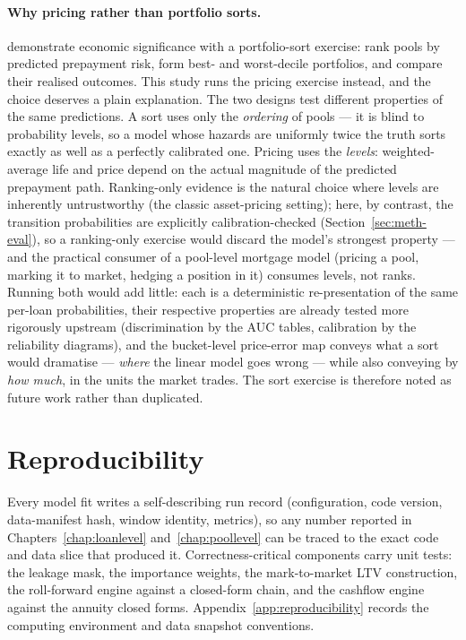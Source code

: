 \paragraph{Why pricing rather than portfolio sorts.}
\citet{sirignano2021} demonstrate economic significance with a
portfolio-sort exercise: rank pools by predicted prepayment risk,
form best- and worst-decile portfolios, and compare their realised
outcomes.  This study runs the pricing exercise instead, and the
choice deserves a plain explanation.  The two designs test different
properties of the same predictions.  A sort uses only the
\emph{ordering} of pools --- it is blind to probability levels, so a
model whose hazards are uniformly twice the truth sorts exactly as
well as a perfectly calibrated one.  Pricing uses the \emph{levels}:
weighted-average life and price depend on the actual magnitude of the
predicted prepayment path.  Ranking-only evidence is the natural
choice where levels are inherently untrustworthy (the classic
asset-pricing setting); here, by contrast, the transition
probabilities are explicitly calibration-checked
(Section~\ref{sec:meth-eval}), so a ranking-only exercise would
discard the model's strongest property --- and the practical consumer
of a pool-level mortgage model (pricing a pool, marking it to market,
hedging a position in it) consumes levels, not ranks.  Running both
would add little: each is a deterministic re-presentation of the same
per-loan probabilities, their respective properties are already
tested more rigorously upstream (discrimination by the AUC tables,
calibration by the reliability diagrams), and the bucket-level
price-error map conveys what a sort would dramatise --- \emph{where}
the linear model goes wrong --- while also conveying by \emph{how
much}, in the units the market trades.  The sort exercise is
therefore noted as future work rather than duplicated.

\section{Reproducibility}
\label{sec:meth-repro}

Every model fit writes a self-describing run record (configuration,
code version, data-manifest hash, window identity, metrics), so any
number reported in Chapters~\ref{chap:loanlevel}
and~\ref{chap:poollevel} can be traced to the
exact code and data slice that produced it.  Correctness-critical
components carry unit tests: the leakage mask, the importance
weights, the mark-to-market LTV construction, the roll-forward engine
against a closed-form chain, and the cashflow engine against the
annuity closed forms.  Appendix~\ref{app:reproducibility} records the
computing environment and data snapshot conventions.

